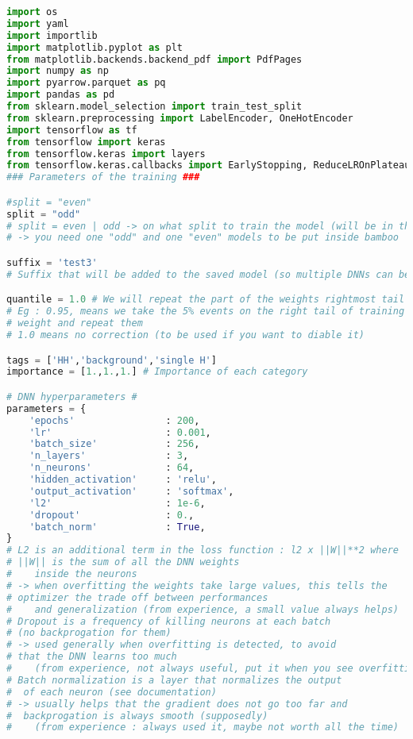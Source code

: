 \begin{lstlisting}[language=Python, caption=Python module of the analysis used in Bamboo framework, label={dnncode}]
import os
import yaml
import importlib
import matplotlib.pyplot as plt
from matplotlib.backends.backend_pdf import PdfPages
import numpy as np
import pyarrow.parquet as pq
import pandas as pd
from sklearn.model_selection import train_test_split
from sklearn.preprocessing import LabelEncoder, OneHotEncoder 
import tensorflow as tf
from tensorflow import keras
from tensorflow.keras import layers
from tensorflow.keras.callbacks import EarlyStopping, ReduceLROnPlateau
### Parameters of the training ###

#split = "even" 
split = "odd" 
# split = even | odd -> on what split to train the model (will be in the name)
# -> you need one "odd" and one "even" models to be put inside bamboo

suffix = 'test3'
# Suffix that will be added to the saved model (so multiple DNNs can be trained)

quantile = 1.0 # We will repeat the part of the weights rightmost tail
# Eg : 0.95, means we take the 5% events on the right tail of training 
# weight and repeat them
# 1.0 means no correction (to be used if you want to diable it)

tags = ['HH','background','single H']
importance = [1.,1.,1.] # Importance of each category

# DNN hyperparameters #
parameters = {
    'epochs'                : 200,
    'lr'                    : 0.001,
    'batch_size'            : 256,
    'n_layers'              : 3,
    'n_neurons'             : 64,
    'hidden_activation'     : 'relu',
    'output_activation'     : 'softmax',
    'l2'                    : 1e-6,
    'dropout'               : 0.,
    'batch_norm'            : True,
}
# L2 is an additional term in the loss function : l2 x ||W||**2 where 
# ||W|| is the sum of all the DNN weights 
#    inside the neurons
# -> when overfitting the weights take large values, this tells the 
# optimizer the trade off between performances
#    and generalization (from experience, a small value always helps)
# Dropout is a frequency of killing neurons at each batch
# (no backprogation for them)
# -> used generally when overfitting is detected, to avoid
# that the DNN learns too much 
#    (from experience, not always useful, put it when you see overfitting)
# Batch normalization is a layer that normalizes the output
#  of each neuron (see documentation)
# -> usually helps that the gradient does not go too far and
#  backprogation is always smooth (supposedly)
#    (from experience : always used it, maybe not worth all the time)



\end{lstlisting}
